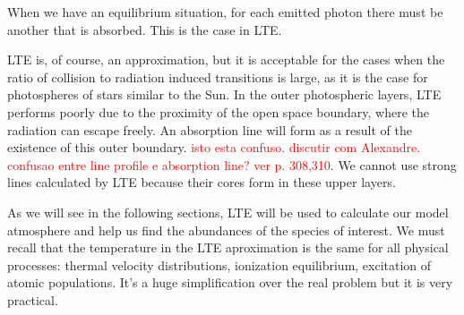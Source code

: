 \documentclass[dvips,12pt,a4paper]{report}
\begin{document}
{When we have an equilibrium situation, for each emitted photon there must be another that is absorbed.%
This is the case in LTE. 

LTE is, of course, an approximation, but it is acceptable for the cases when the ratio of collision to radiation induced transitions is large, as it is the case for photospheres of stars similar to the Sun. In the outer photospheric layers, LTE performs poorly due to the proximity of the open space boundary, where the radiation can escape freely. An absorption line will form as a result of the existence of this outer boundary. \textcolor{red}{isto esta confuso. discutir com Alexandre. confusao entre line profile e absorption line? ver p. 308,310}. We cannot use strong lines calculated by LTE because their cores form in these upper layers.

As we will see in the following sections, LTE will be used to calculate our model atmosphere and help us find the abundances of the species of interest. We must recall that the temperature in the LTE aproximation is the same for all physical processes: thermal velocity distributions, ionization equilibrium, excitation of atomic populations. It's a huge simplification over the real problem but it is very practical.








}
\end{document}
